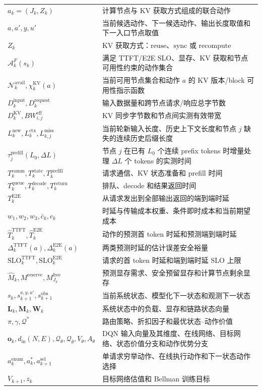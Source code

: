 \begin{longtable}{p{}p{}}
\(a_k=(J_k,Z_k)\) & 计算节点与 KV 获取方式组成的联合动作 \\
\(a,a',y,u'\) & 当前候选动作、下一候选动作、输出长度取值和下一入口节点取值 \\
\(Z_k\) & KV 获取方式：\(\mathrm{reuse}\)、\(\mathrm{sync}\) 或 \(\mathrm{recompute}\) \\
\(\mathcal A_k^F(s_k)\) & 满足 TTFT/E2E SLO、显存、KV 获取和节点可用性约束的动作集合 \\
\(\mathcal N_k^{\mathrm{avail}},\chi_k^{\mathrm{KV}}(a)\) & 当前可用节点集合和动作 \(a\) 的 KV 版本/block 可用性指示函数 \\
\(D_k^{\mathrm{input}},D_k^{\mathrm{request}}\) & 输入数据量和跨节点请求/响应总字节数 \\
\(D_k^{\mathrm{KV}},BW_{i,j}^{\mathrm{eff}}\) & KV 同步字节数和节点间实测有效带宽 \\
\(L_k^{\mathrm{new}},L_k^{\mathrm{ctx}},L_{k,j}^{\mathrm{miss}}\) & 当前轮新输入长度、历史上下文长度和节点 \(j\) 缺失的连续历史后缀长度 \\
\(\tau_j^{\mathrm{prefill}}(L_0,\Delta L)\) & 节点 \(j\) 在已有 \(L_0\) 个连续 prefix tokens 时增量处理 \(\Delta L\) 个 tokens 的实测时间 \\
\(T_k^{\mathrm{comm}},T_k^{\mathrm{state}},T_k^{\mathrm{prefill}}\) & 请求通信、KV 状态准备和 prefill 时间 \\
\(T_k^{\mathrm{queue}},T_k^{\mathrm{decode}},T_k^{\mathrm{return}}\) & 排队、decode 和结果返回时间 \\
\(T_k^{\mathrm{E2E}}\) & 从请求发出到全部输出返回的端到端时延 \\
\(w_1,w_2,w_3,\bar c_k,c_k\) & 时延与传输成本权重、条件即时成本和当前期望成本 \\
\(\widehat T_k^{\mathrm{TTFT}},\widehat T_k^{\mathrm{E2E}}\) & 动作的预测首 token 时延和预测端到端时延 \\
\(\Delta_k^{\mathrm{TTFT}}(a),\Delta_k^{\mathrm{E2E}}(a)\) & 两类预测时延的估计误差安全裕量 \\
\(\mathrm{SLO}_k^{\mathrm{TTFT}},\mathrm{SLO}_k^{\mathrm{E2E}}\) & 请求的首 token 时延和端到端时延 SLO 上限 \\
\(\widehat M_k,M^{\mathrm{reserve}},M_{J_k}^{\mathrm{free}}\) & 预测显存需求、安全预留显存和计算节点剩余显存 \\
\(s_k,s_{k+1}^{a,y,u'},s_{k+1}^{\mathrm{obs}}\) & 当前系统状态、模型化下一状态和观测下一状态 \\
\(\mathbf L_k,\mathbf M_k,\mathbf W_k\) & 系统状态中的负载、显存和链路状态向量 \\
\(\pi,\gamma,\mathcal Q^*\) & 路由策略、折扣因子和最优状态--动作价值 \\
\(\mathbf o_k,d_{\mathrm{in}}(N,E),\mathcal Q_\theta,\mathcal Q_{\bar\theta},V_\theta,A_\theta\) & DQN 输入向量及其维度、在线网络、目标网络、状态价值分支和动作优势分支 \\
\(a_k^{\mathrm{enum}},a_k^*,a_{k+1}^{\mathrm{sel}}\) & 单请求穷举动作、在线执行动作和下一状态动作选择 \\
\(V_{k+1},z_k\) & 目标网络估值和 Bellman 训练目标 \\
\bottomrule
\end{longtable}
\endgroup


